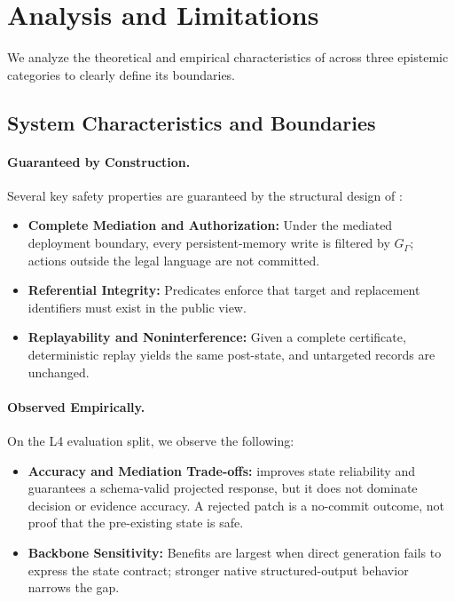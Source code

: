 \section{Analysis and Limitations}

We analyze the theoretical and empirical characteristics of \method{} across three epistemic categories to clearly define its boundaries.

\subsection{System Characteristics and Boundaries}

\paragraph{Guaranteed by Construction.}
Several key safety properties are guaranteed by the structural design of \method{}:
\begin{itemize}[leftmargin=*]
\item \textbf{Complete Mediation and Authorization:} Under the mediated deployment boundary, every persistent-memory write is filtered by $G_\Gamma$; actions outside the legal language are not committed.
\item \textbf{Referential Integrity:} Predicates enforce that target and replacement identifiers must exist in the public view.
\item \textbf{Replayability and Noninterference:} Given a complete certificate, deterministic replay yields the same post-state, and untargeted records are unchanged.
\end{itemize}

\paragraph{Observed Empirically.}
On the L4 evaluation split, we observe the following:
\begin{itemize}[leftmargin=*]
\item \textbf{Accuracy and Mediation Trade-offs:} \method{} improves state reliability and guarantees a schema-valid projected response, but it does not dominate decision or evidence accuracy. A rejected patch is a no-commit outcome, not proof that the pre-existing state is safe.
\item \textbf{Backbone Sensitivity:} Benefits are largest when direct generation fails to express the state contract; stronger native structured-output behavior narrows the gap.
\end{itemize}

